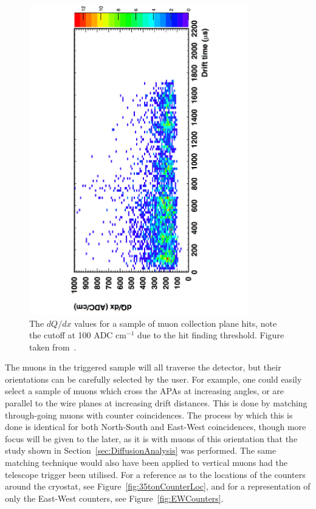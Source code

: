 \begin{figure}
  \centering
  \includegraphics[width=0.85\textwidth]{TingjunLifetime}
  \caption[$dQ/dx$ in the 35 ton as a function of drift time]
          {The $dQ/dx$ values for a sample of muon collection plane hits, note the cutoff at 100 ADC cm$^{-1}$ due to the hit finding threshold. Figure taken from~\citep{TingjunLifetime}.}
  \label{fig:TingjunLifetime}
\end{figure}  

The muons in the triggered sample will all traverse the detector, but their orientations can be carefully selected by the user. For example, one could easily select a sample of muons which cross the APAs at increasing angles, or are parallel to the wire planes at increasing drift distances. This is done by matching through-going muons with counter coincidences. The process by which this is done is identical for both North-South and East-West coincidences, though more focus will be given to the later, as it is with muons of this orientation that the study shown in Section~\ref{sec:DiffusionAnalysis} was performed. The same matching technique would also have been applied to vertical muons had the telescope trigger been utilised. For a reference as to the locations of the counters around the cryostat, see Figure~\ref{fig:35tonCounterLoc}, and for a representation of only the East-West counters, see Figure~\ref{fig:EWCounters}. \\

